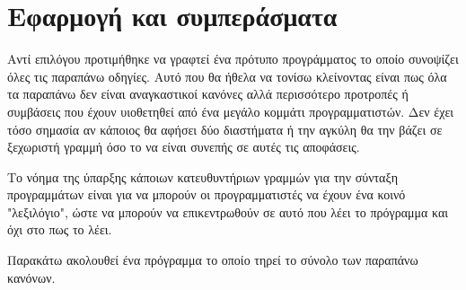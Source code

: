 \documentclass{assignment}
\begin{document}





\section{Εφαρμογή και συμπεράσματα}

Αντί επιλόγου προτιμήθηκε να γραφτεί ένα πρότυπο προγράμματος το οποίο συνοψίζει όλες τις παραπάνω οδηγίες. Αυτό που θα ήθελα να τονίσω κλείνοντας είναι πως όλα τα παραπάνω δεν είναι αναγκαστικοί κανόνες αλλά περισσότερο προτροπές ή συμβάσεις που έχουν υιοθετηθεί από ένα μεγάλο κομμάτι προγραμματιστών. Δεν έχει τόσο σημασία αν κάποιος θα αφήσει δύο διαστήματα ή την αγκύλη θα την βάζει σε ξεχωριστή γραμμή όσο το να είναι συνεπής σε αυτές τις αποφάσεις.

Το νόημα της ύπαρξης κάποιων κατευθυντήριων γραμμών για την σύνταξη προγραμμάτων είναι για να μπορούν οι προγραμματιστές να έχουν ένα κοινό "λεξιλόγιο", ώστε να μπορούν να επικεντρωθούν σε αυτό που λέει το πρόγραμμα και όχι στο πως το λέει. 

Παρακάτω ακολουθεί ένα πρόγραμμα το οποίο τηρεί το σύνολο των παραπάνω κανόνων. 
\end{document}
